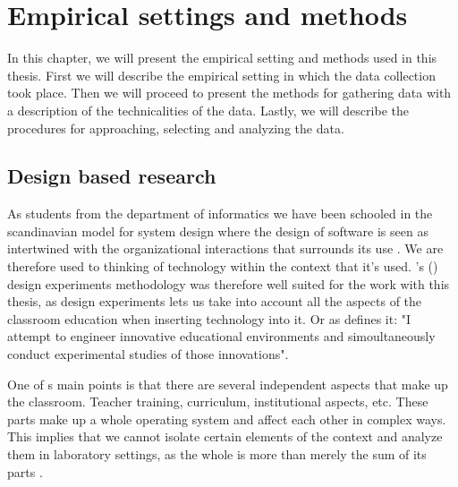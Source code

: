 \chapter{Empirical settings and methods}
In this chapter, we will present the empirical setting and methods used in this thesis. First we will describe the empirical setting in which the data collection took place. Then we will proceed to present the methods for gathering data with a description of the technicalities of the data. Lastly, we will describe the procedures for approaching, selecting and analyzing the data.


\section{Design based research}
As students from the department of informatics we have been schooled in the scandinavian model for system design where the design of software is seen as intertwined with the organizational interactions that surrounds its use \citep{bjerknes1987computers}. We are therefore used to thinking of technology within the context that it's used. \citeauthor{brown1992design}'s (\citeyear{brown1992design}) design experiments methodology was therefore well suited for the work with this thesis, as design experiments lets us take into account all the aspects of the classroom education when inserting technology into it. Or as \citet{brown1992design} defines it: "I attempt to engineer innovative educational environments and simoultaneously conduct experimental studies of those innovations".

One of \citeauthor{brown1992design}s main points is that there are several independent aspects that make up the classroom. Teacher training, curriculum, institutional aspects, etc. These parts make up a whole operating system and affect each other in complex ways. This implies that we cannot isolate certain elements of the context and analyze them in laboratory settings, as the whole is more than merely the sum of its parts \citep{brown1992design}.

